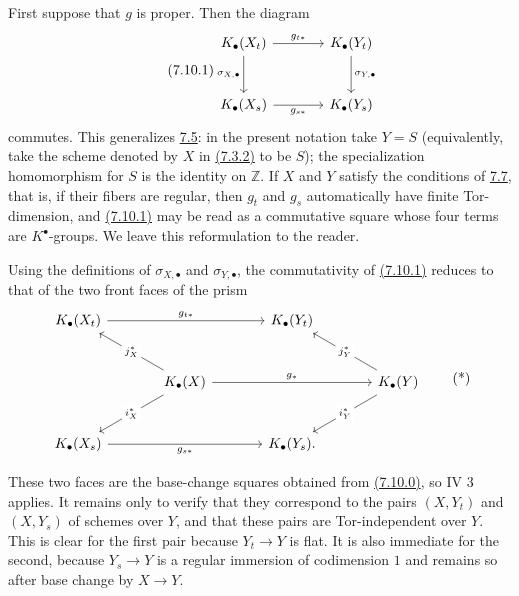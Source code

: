 First suppose that $g$ is proper. Then the diagram
\begin{equation}\tag{7.10.1}
\begin{tikzcd}[column sep=large,row sep=large]
K_\bullet(X_t) \arrow[r,"g_{t*}"] \arrow[d,"\sigma_{X,\bullet}"'] &
K_\bullet(Y_t) \arrow[d,"\sigma_{Y,\bullet}"]\\
K_\bullet(X_s) \arrow[r,"g_{s*}"'] & K_\bullet(Y_s)
\end{tikzcd}
\end{equation}
commutes. This generalizes \hyperlink{sga6.e10.sec.7.5}{7.5}: in the present notation take $Y=S$
(equivalently, take the scheme denoted by $X$ in \hyperlink{sga6.e10.eq.7-3-2}{(7.3.2)} to be $S$); the
specialization homomorphism for $S$ is the identity on $\mathbb Z$. If $X$
and $Y$ satisfy the conditions of \hyperlink{sga6.e10.sec.7.7}{7.7}, that is, if their fibers are
regular, then $g_t$ and $g_s$ automatically have finite Tor-dimension, and
\hyperlink{sga6.e10.eq.7-10-1}{(7.10.1)} may be read as a commutative square whose four terms are
$K^\bullet$-groups. We leave this reformulation to the reader.

Using the definitions of $\sigma_{X,\bullet}$ and $\sigma_{Y,\bullet}$,
the commutativity of \hyperlink{sga6.e10.eq.7-10-1}{(7.10.1)} reduces to that of the two front faces of the
prism
\[
\begin{tikzcd}[column sep=large,row sep=large]
K_\bullet(X_t) \arrow[rr,"g_{t*}"] && K_\bullet(Y_t)\\
& K_\bullet(X) \arrow[ul,"j_X^*" description]
  \arrow[dl,"i_X^*" description] \arrow[rr,"g_*"] &&
K_\bullet(Y) \arrow[ul,"j_Y^*" description]
  \arrow[dl,"i_Y^*" description]\\
K_\bullet(X_s) \arrow[rr,"g_{s*}"'] && K_\bullet(Y_s).
\end{tikzcd}
\tag{*}
\]

These two faces are the base-change squares obtained from \hyperlink{sga6.e10.eq.7-10-0}{(7.10.0)}, so IV 3
applies. It remains only to verify that they correspond to the pairs
$(X,Y_t)$ and $(X,Y_s)$ of schemes over $Y$, and that these pairs are
Tor-independent over $Y$. This is clear for the first pair because
$Y_t\to Y$ is flat. It is also immediate for the second, because
$Y_s\to Y$ is a regular immersion of codimension $1$ and remains so after
base change by $X\to Y$.

